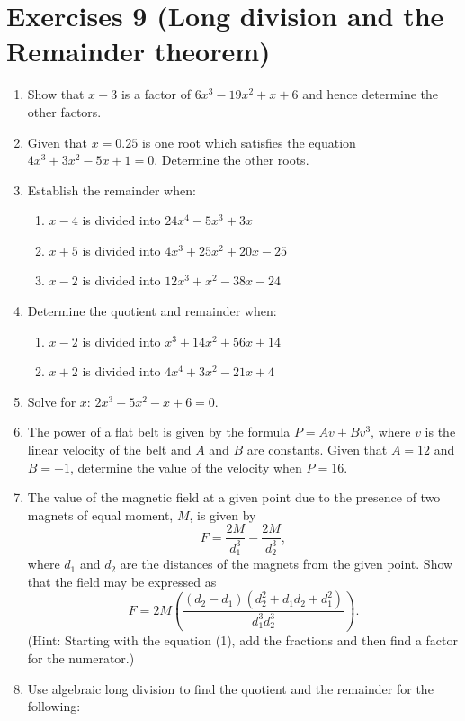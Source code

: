 \documentclass[
  12pt,
  oneside]{book}
\providecommand{\tightlist}{%
  \setlength{\itemsep}{0pt}\setlength{\parskip}{0pt}}
\theoremstyle{definition}
\theoremstyle{definition}
\theoremstyle{definition}
\theoremstyle{definition}
\theoremstyle{remark}
\begin{document}
\hypertarget{exercises-9-long-division-and-the-remainder-theorem}{%
\chapter*{Exercises 9 (Long division and the Remainder theorem)}\label{exercises-9-long-division-and-the-remainder-theorem}}

\begin{enumerate}
\def\labelenumi{\arabic{enumi}.}
\item
  Show that \(x - 3\) is a factor of \(6x^3 - 19x^2 + x + 6\) and hence determine the other factors.
\item
  Given that \(x = 0.25\) is one root which satisfies the equation \(4x^3 + 3x^2 - 5x + 1 = 0\). Determine the other roots.
\item
  Establish the remainder when:

  \begin{enumerate}
  \def\labelenumii{\roman{enumii})}
  \tightlist
  \item
    \(x - 4\) is divided into \(24x^4 - 5x^3 + 3x\)
  \item
    \(x + 5\) is divided into \(4x^3 + 25x^2 + 20x - 25\)
  \item
    \(x - 2\) is divided into \(12x^3 + x^2 - 38x - 24\)
  \end{enumerate}
\item
  Determine the quotient and remainder when:

  \begin{enumerate}
  \def\labelenumii{\roman{enumii})}
  \tightlist
  \item
    \(x - 2\) is divided into \(x^3 + 14x^2 + 56x + 14\)
  \item
    \(x + 2\) is divided into \(4x^4 + 3x^2 - 21x + 4\)
  \end{enumerate}
\item
  Solve for \(x\): \(2x^3-5x^2-x+6=0\).
\item
  The power of a flat belt is given by the formula \(P = Av + Bv^3\), where \(v\) is the linear velocity of the belt and \(A\) and \(B\) are constants. Given that \(A = 12\) and \(B = -1\), determine the value of the velocity when \(P = 16\).
\item
  The value of the magnetic field at a given point due to the presence of two magnets of equal moment, \(M\), is given by
  \[F=\frac{2M}{d_1^3}-\frac{2M}{d_2^3}, \tag{1}\]
  where \(d_1\) and \(d_2\) are the distances of the magnets from the given point. Show that the field may be expressed as
  \[F=2M\left(\frac{(d_2-d_1)(d_2^2+d_1d_2+d_1^2)}{d_1^3d_2^3}\right). \tag{2}\]
  (Hint: Starting with the equation (1), add the fractions and then find a factor for the numerator.)
\item
  Use algebraic long division to find the quotient and the remainder for the following:


\end{enumerate}
\end{document}
